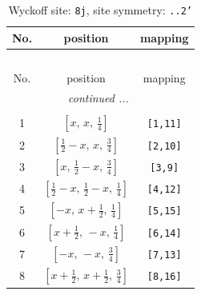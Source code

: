 \documentclass[fleqn,8pt]{jsarticle}
\begin{document}
\begin{longtable}{ccc}
\caption{Wyckoff site: {\tt 8j}, site symmetry: {\tt ..2'}}
 \\
 \hline \hline
No. & position & mapping \\ \hline \endfirsthead

\multicolumn{2}{l}{\tablename\ \thetable{}} \\
 \hline \hline
No. & position & mapping \\ \hline \endhead

 \hline \hline
\multicolumn{2}{r}{\footnotesize\it continued ...} \\ \endfoot

 \hline \hline
\multicolumn{2}{r}{} \\ \endlastfoot

1 & $\left[ x,\, x,\, \frac{1}{4} \right]$ & {\tt [1,11]} \\ \hline
2 & $\left[ \frac{1}{2} - x,\, x,\, \frac{3}{4} \right]$ & {\tt [2,10]} \\ \hline
3 & $\left[ x,\, \frac{1}{2} - x,\, \frac{3}{4} \right]$ & {\tt [3,9]} \\ \hline
4 & $\left[ \frac{1}{2} - x,\, \frac{1}{2} - x,\, \frac{1}{4} \right]$ & {\tt [4,12]} \\ \hline
5 & $\left[ - x,\, x + \frac{1}{2},\, \frac{1}{4} \right]$ & {\tt [5,15]} \\ \hline
6 & $\left[ x + \frac{1}{2},\, - x,\, \frac{1}{4} \right]$ & {\tt [6,14]} \\ \hline
7 & $\left[ - x,\, - x,\, \frac{3}{4} \right]$ & {\tt [7,13]} \\ \hline
8 & $\left[ x + \frac{1}{2},\, x + \frac{1}{2},\, \frac{3}{4} \right]$ & {\tt [8,16]} \\
\end{longtable}
\renewcommand{\arraystretch}{1.2}
\end{document}
